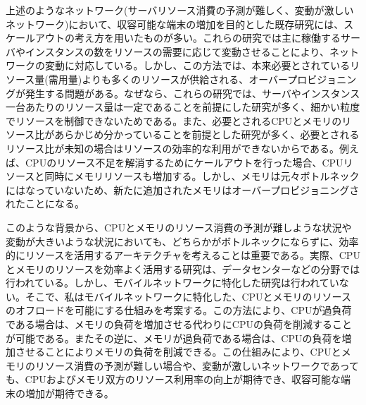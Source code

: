 \documentclass[a4j]{ujarticle}
\begin{document}
上述のようなネットワーク(サーバリソース消費の予測が難しく、変動が激しいネットワーク)において、収容可能な端末の増加を目的とした既存研究には、スケールアウトの考え方を用いたものが多い。これらの研究では主に稼働するサーバやインスタンスの数をリソースの需要に応じて変動させることにより、ネットワークの変動に対応している。しかし、この方法では、本来必要とされているリソース量(需用量)よりも多くのリソースが供給される、オーバープロビジョニングが発生する問題がある。なぜなら、これらの研究では、サーバやインスタンス一台あたりのリソース量は一定であることを前提にした研究が多く、細かい粒度でリソースを制御できないためである。また、必要とされるCPUとメモリのリソース比があらかじめ分かっていることを前提とした研究が多く、必要とされるリソース比が未知の場合はリソースの効率的な利用ができないからである。例えば、CPUのリソース不足を解消するためにケールアウトを行った場合、CPUリソースと同時にメモリリソースも増加する。しかし、メモリは元々ボトルネックにはなっていないため、新たに追加されたメモリはオーバープロビジョニングされたことになる。


このような背景から、CPUとメモリのリソース消費の予測が難しような状況や変動が大きいような状況においても、どちらかがボトルネックにならずに、効率的にリソースを活用するアーキテクチャを考えることは重要である。実際、CPUとメモリのリソースを効率よく活用する研究は、データセンターなどの分野では行われている\cite{TechnoEconomicFrameworkforCloudInfrastructureACostStudyofResourceDisaggregation}。しかし、モバイルネットワークに特化した研究は行われていない。そこで、私はモバイルネットワークに特化した、CPUとメモリのリソースのオフロードを可能にする仕組みを考案する。この方法により、CPUが過負荷である場合は、メモリの負荷を増加させる代わりにCPUの負荷を削減することが可能である。またその逆に、メモリが過負荷である場合は、CPUの負荷を増加させることによりメモリの負荷を削減できる。この仕組みにより、CPUとメモリのリソース消費の予測が難しい場合や、変動が激しいネットワークであっても、CPUおよびメモリ双方のリソース利用率の向上が期待でき、収容可能な端末の増加が期待できる。

\end{document}
